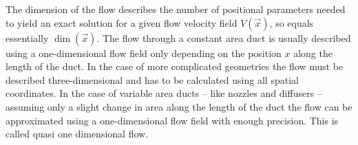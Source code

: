 	The dimension of the flow describes the number of positional parameters needed to yield an exact solution for a given flow velocity field $V(\vec{x})$, so equals essentially $\dim(\vec{x})$. 
	The flow through a constant area duct is usually described using a one-dimensional flow field only depending on the position $x$ along the length of the duct.
	In the case of more complicated geometries the flow must be described three-dimensional and has to be calculated using all spatial coordinates.
	In the case of variable area ducts -- like nozzles and diffusers -- assuming only a slight change in area along the length of the duct the flow can be approximated using a one-dimensional flow field with enough precision.
	This is called quasi one dimensional flow. \cite{anderson2021modern}

